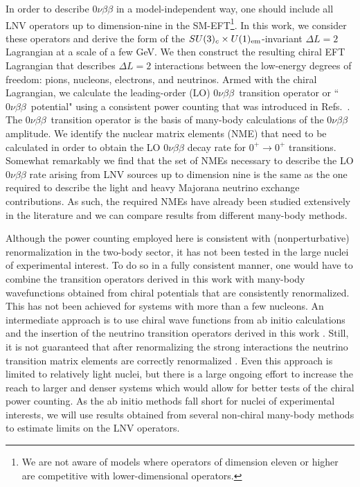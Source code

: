 \documentclass[letterpaper,11pt]{article}
\newcommand{\NLDBD}{$0 \nu \beta \beta$}
\begin{document}
In order  to describe $0\nu\beta\beta$ in a model-independent way, one should include all LNV operators up to dimension-nine in the SM-EFT\footnote{We are not aware of models where operators of dimension eleven or higher are competitive with lower-dimensional operators.}. In this work, we consider these operators and derive the form of the $SU(3)_c\times U(1)_{\rm em}$-invariant $\Delta L=2$ Lagrangian at a scale of a few GeV. We then construct the resulting chiral EFT Lagrangian that describes $\Delta L=2$ interactions between the low-energy degrees of freedom: pions, nucleons, electrons, and neutrinos. 
Armed with the chiral Lagrangian, we calculate the leading-order (LO) \NLDBD\  transition operator  or ``\NLDBD\ potential"  using a consistent power counting that was introduced in Refs.~\cite{Cirigliano:2017djv,Cirigliano:2017tvr,Cirigliano:2018hja}. The \NLDBD\  transition operator is the basis of many-body calculations of the $0\nu\beta\beta$ amplitude. We identify the nuclear matrix elements (NME) that need to be calculated in order to obtain the LO $0\nu\beta\beta$ decay rate for $0^+ \rightarrow 0^+$ transitions. Somewhat remarkably we find that the set of NMEs necessary to describe the LO $0\nu\beta\beta$ rate arising from LNV sources up to dimension nine is the same as the one required to describe the light
and heavy Majorana neutrino exchange contributions. As such, the required NMEs have already been studied extensively in the literature and we can compare results from different many-body methods.


Although the power counting employed here is consistent with (nonperturbative)
renormalization in the two-body sector, it has not been tested in the large nuclei
of experimental interest. To do so in a fully consistent manner, one would have to combine
the transition operators derived in this work with many-body wavefunctions obtained from
chiral potentials that are consistently renormalized. This has not been achieved for systems with more 
than a few nucleons. An intermediate approach is to use chiral wave functions from ab initio calculations \cite{Hagen:2013nca,Hagen:2013yba,Hagen:2016xjv} and the insertion of the neutrino transition operators derived in this work \cite{Pastore:2017ofx}. Still, it is not guaranteed that after renormalizing the strong interactions the 
neutrino transition matrix elements are correctly renormalized \cite{Cirigliano:2018hja}. Even this approach is limited to relatively light nuclei, but there is
a large ongoing effort to increase the reach to larger and denser systems which would allow for 
better tests of the chiral power counting. As the ab initio methods fall short for nuclei of experimental 
interests, we will use results obtained from several non-chiral many-body methods \cite{Hyvarinen:2015bda,Menendez:2017fdf,Barea:2015kwa,Barea} to estimate limits on the LNV operators.
\end{document}
